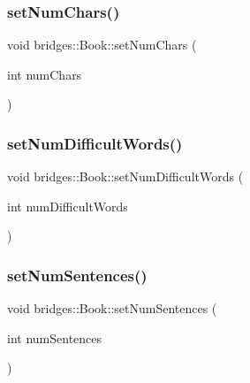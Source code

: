 \subsubsection{\texorpdfstring{set\+Num\+Chars()}{setNumChars()}}
{\footnotesize\ttfamily void bridges\+::\+Book\+::set\+Num\+Chars (\begin{DoxyParamCaption}\item[{int}]{num\+Chars }\end{DoxyParamCaption})\hspace{0.3cm}{\ttfamily [inline]}}

\hypertarget{classbridges_1_1_book_adc7a54f2a494aeac02cadb3eb4caedbc}{}\label{classbridges_1_1_book_adc7a54f2a494aeac02cadb3eb4caedbc} 
\subsubsection{\texorpdfstring{set\+Num\+Difficult\+Words()}{setNumDifficultWords()}}
{\footnotesize\ttfamily void bridges\+::\+Book\+::set\+Num\+Difficult\+Words (\begin{DoxyParamCaption}\item[{int}]{num\+Difficult\+Words }\end{DoxyParamCaption})\hspace{0.3cm}{\ttfamily [inline]}}

\hypertarget{classbridges_1_1_book_af16061c14c40b1672c7801a4c3a2d33b}{}\label{classbridges_1_1_book_af16061c14c40b1672c7801a4c3a2d33b} 
\subsubsection{\texorpdfstring{set\+Num\+Sentences()}{setNumSentences()}}
{\footnotesize\ttfamily void bridges\+::\+Book\+::set\+Num\+Sentences (\begin{DoxyParamCaption}\item[{int}]{num\+Sentences }\end{DoxyParamCaption})\hspace{0.3cm}{\ttfamily [inline]}}

\hypertarget{classbridges_1_1_book_acbed3f0ff253868d8747826a27ef30ac}{}\label{classbridges_1_1_book_acbed3f0ff253868d8747826a27ef30ac} 
